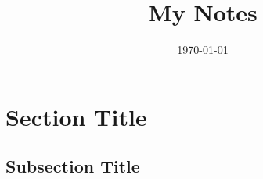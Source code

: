 \documentclass[10pt]{article}
\title{My Notes}
\author{}
\date{\today}
\begin{document}
\maketitle

\section{Section Title}
\subsection{Subsection Title}
\end{document}

